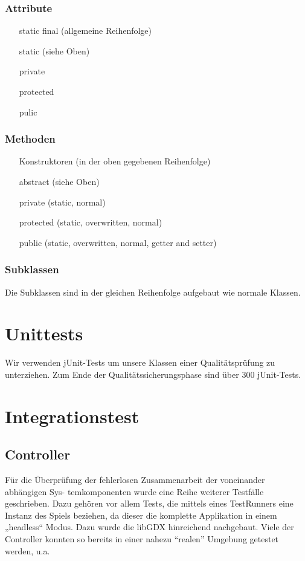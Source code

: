 \documentclass[parskip=full]{scrreprt}
\begin{document}
\subsection{Attribute}
\begin{enumerate}
	\item[static final] (allgemeine Reihenfolge) 
	\item[static] (siehe Oben)
	\item[private]
	\item[protected]
	\item[pulic]
\end{enumerate}
\subsection{Methoden}
\begin{enumerate}
	\item[Konstruktoren] (in der oben gegebenen Reihenfolge)
	\item[abstract] (siehe Oben)
	\item[private] (static, normal)
	\item[protected] (static, overwritten, normal)
	\item[public] (static, overwritten, normal, getter and setter)
\end{enumerate}
\subsection{Subklassen}
Die Subklassen sind in der gleichen Reihenfolge aufgebaut wie normale Klassen.



\chapter{Unittests}

Wir verwenden jUnit-Tests um unsere Klassen einer Qualitätsprüfung zu unterziehen. Zum Ende der Qualitätssicherungsphase sind über 300 jUnit-Tests.

\chapter{Integrationstest}



\section{Controller}

Für die Überprüfung der fehlerlosen Zusammenarbeit der voneinander abhängigen Sys- temkomponenten wurde eine Reihe weiterer Testfälle geschrieben. Dazu gehören vor allem Tests, die mittels eines TestRunners eine Instanz des Spiels beziehen, da dieser die komplette Applikation in einem „headless“ Modus. Dazu wurde die libGDX hinreichend nachgebaut. Viele der Controller konnten so bereits in einer nahezu \enquote{realen} Umgebung getestet werden, u.a.
\end{document}

